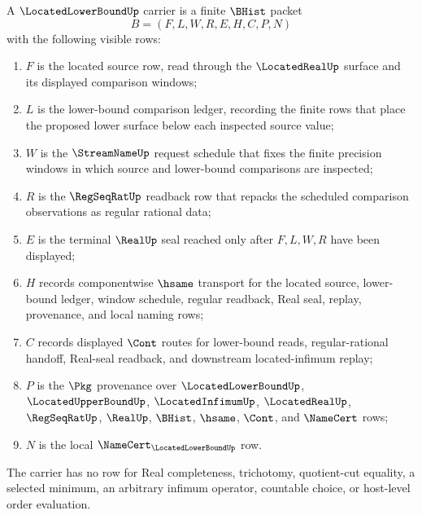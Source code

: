 \begin{definition}
\label{def:located-lower-bound-carrier}
A $\LocatedLowerBoundUp$ carrier is a finite $\BHist$ packet
$$
B=(F,L,W,R,E,H,C,P,N)
$$
with the following visible rows:
\begin{enumerate}
\item $F$ is the located source row, read through the $\LocatedRealUp$ surface and its displayed comparison windows;
\item $L$ is the lower-bound comparison ledger, recording the finite rows that place the proposed lower surface below each inspected source value;
\item $W$ is the $\StreamNameUp$ request schedule that fixes the finite precision windows in which source and lower-bound comparisons are inspected;
\item $R$ is the $\RegSeqRatUp$ readback row that repacks the scheduled comparison observations as regular rational data;
\item $E$ is the terminal $\RealUp$ seal reached only after $F,L,W,R$ have been displayed;
\item $H$ records componentwise $\hsame$ transport for the located source, lower-bound ledger, window schedule, regular readback, Real seal, replay, provenance, and local naming rows;
\item $C$ records displayed $\Cont$ routes for lower-bound reads, regular-rational handoff, Real-seal readback, and downstream located-infimum replay;
\item $P$ is the $\Pkg$ provenance over $\LocatedLowerBoundUp$, $\LocatedUpperBoundUp$, $\LocatedInfimumUp$, $\LocatedRealUp$, $\RegSeqRatUp$, $\RealUp$, $\BHist$, $\hsame$, $\Cont$, and $\NameCert$ rows;
\item $N$ is the local $\NameCert_{\LocatedLowerBoundUp}$ row.
\end{enumerate}
The carrier has no row for Real completeness, trichotomy, quotient-cut equality, a selected minimum, an arbitrary infimum operator, countable choice, or host-level order evaluation.
\end{definition}

